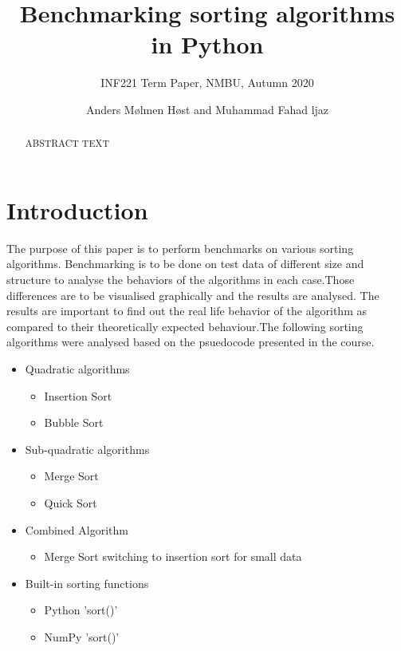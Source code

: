 \documentclass[sigconf, nonacm, natbib, screen, balance=False]{acmart}
\begin{document}
\title{Benchmarking sorting algorithms in Python}
\subtitle{INF221 Term Paper, NMBU, Autumn 2020}

\author{Anders Mølmen Høst and Muhammad Fahad ljaz}

\begin{abstract}
ABSTRACT TEXT
\vspace
\end{abstract}

\maketitle

\section{Introduction}\label{sec:intro}

The purpose of this paper is to perform benchmarks on various sorting algorithms. Benchmarking is to be done on test data of different size and structure to analyse the behaviors of the algorithms in each case.Those differences are to be visualised graphically and the results are analysed. The results are important to find out the real life behavior of the algorithm as compared to their theoretically expected behaviour.The following sorting algorithms were analysed based on the psuedocode presented in the course.
\begin{itemize}
\item Quadratic algorithms
    \begin{itemize}
    \item Insertion Sort
    \item Bubble Sort
    \end{itemize}
\item Sub-quadratic algorithms
    \begin{itemize}
    \item Merge Sort
    \item Quick Sort
    \end{itemize}
\item Combined Algorithm
    \begin{itemize}
    \item Merge Sort switching to insertion sort for small data
    \end{itemize}
\item Built-in sorting functions
    \begin{itemize}
    \item Python 'sort()'
    \item NumPy 'sort()'
    \end{itemize}
\end{itemize}
\end{document}
